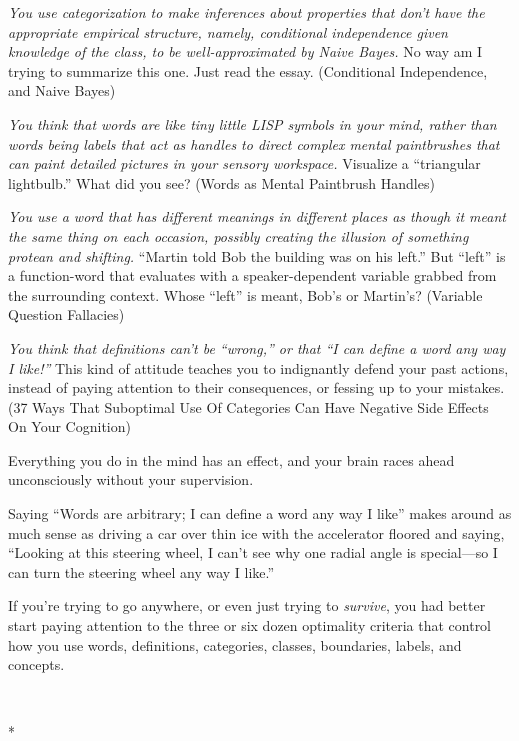 {
 \textit{You use categorization to make inferences about properties
that don't have the appropriate empirical structure,
namely, conditional independence given knowledge of the class, to be
well-approximated by Naive Bayes.} No way am I trying to summarize this
one. Just read the essay. (Conditional Independence, and Naive Bayes)}

{
 \textit{You think that words are like tiny little LISP symbols in
your mind, rather than words being labels that act as handles to direct
complex mental paintbrushes that can paint detailed pictures in your
sensory workspace.} Visualize a ``triangular
lightbulb.'' What did you see? (Words as Mental
Paintbrush Handles)}

{
 \textit{You use a word that has different meanings in different
places as though it meant the same thing on each occasion, possibly
creating the illusion of something protean and shifting.}
``Martin told Bob the building was on his
left.'' But
``left'' is a function-word that
evaluates with a speaker-dependent variable grabbed from the
surrounding context. Whose ``left''
is meant, Bob's or Martin's? (Variable
Question Fallacies)}

{
 \textit{You think that definitions can't be
``wrong,'' or that
``I can define a word any way I
like!''} This kind of attitude teaches you to
indignantly defend your past actions, instead of paying attention to
their consequences, or fessing up to your mistakes. (37 Ways That
Suboptimal Use Of Categories Can Have Negative Side Effects On Your
Cognition)}

{
 Everything you do in the mind has an effect, and your brain races
ahead unconsciously without your supervision.}

{
 Saying ``Words are arbitrary; I can define a word
any way I like'' makes around as much sense as
driving a car over thin ice with the accelerator floored and saying,
``Looking at this steering wheel, I
can't see why one radial angle is special---so I can
turn the steering wheel any way I like.''}

{
 If you're trying to go anywhere, or even just
trying to \textit{survive}, you had better start paying attention to
the three or six dozen optimality criteria that control how you use
words, definitions, categories, classes, boundaries, labels, and
concepts.}

{\centering
 \ ~
\par}

{\centering
 *
\par}

